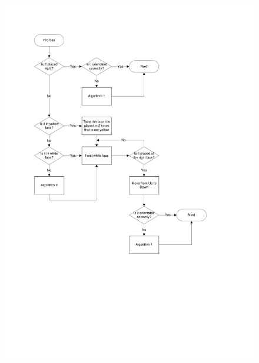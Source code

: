 \begin{figure}[htbp]
	\centering
		\includegraphics[width=\textwidth]{input/pics/FlCrossFlow.pdf}
	\label{fig:FlCrossFlow}
\end{figure}
